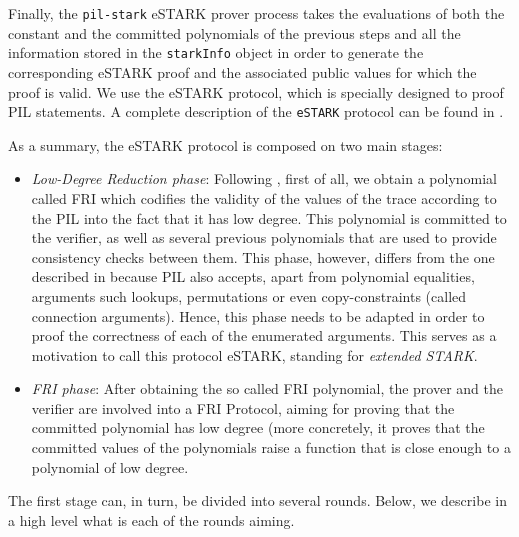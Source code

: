 Finally, the \texttt{pil-stark} \textsf{eSTARK} prover process takes the evaluations of both the constant and the committed polynomials of the previous steps and all the information stored in the \texttt{starkInfo} object in order to generate the corresponding \textsf{eSTARK} proof and the associated public values for which the proof is valid. We use the \textsf{eSTARK} protocol, which is specially designed to proof PIL statements. A complete description of the \texttt{eSTARK} protocol can be found in \cite{EPRINT:MGBT}.

As a summary, the \textsf{eSTARK} protocol is composed on two main stages:

\begin{itemize}
\item \textit{Low-Degree Reduction phase}: Following \cite{EPRINT:StarkWare21}, first of all, we obtain a polynomial called FRI which codifies the validity of the values of the trace according to the PIL into the fact that it has low degree. This polynomial is committed to the verifier, as well as several previous polynomials that are used to provide consistency checks between them.  This phase, however, differs from the one described in \cite{EPRINT:StarkWare21} because PIL also accepts, apart from polynomial equalities, arguments such lookups, permutations or even copy-constraints (called connection arguments). Hence, this phase needs to be adapted in order to proof the correctness of each of the enumerated arguments. This serves as a motivation to call this protocol \textsf{eSTARK}, standing for \textit{extended STARK}.

\item \textit{FRI phase}: After obtaining the so called FRI polynomial, the prover and the verifier are involved into a FRI Protocol, aiming for proving that the committed polynomial has low degree (more concretely, it proves that the committed values of the polynomials raise a function that is close enough to a polynomial of low degree.

\end{itemize}

The first stage can, in turn, be divided into several rounds. Below, we describe in a high level what is each of the rounds aiming.

